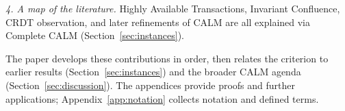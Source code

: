 \noindent
\emph{4. A map of the literature.} Highly Available Transactions, Invariant
        Confluence, CRDT observation, and later refinements of CALM are all
        explained via Complete CALM (Section~\ref{sec:instances}).

\vspace{0.5em}
\noindent
The paper develops these contributions in order, then relates the criterion to
earlier results (Section~\ref{sec:instances}) and the broader CALM agenda
(Section~\ref{sec:discussion}).  The appendices provide proofs and further
applications; Appendix~\ref{app:notation} collects notation and defined terms.
